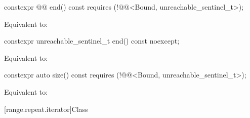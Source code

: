 %
\begin{itemdecl}
constexpr @@ end() const requires (!@@<Bound, unreachable_sentinel_t>);
\end{itemdecl}

\begin{itemdescr}
\pnum
\effects
Equivalent to: 
\end{itemdescr}

%
\begin{itemdecl}
constexpr unreachable_sentinel_t end() const noexcept;
\end{itemdecl}

\begin{itemdescr}
\pnum
\effects
Equivalent to: 
\end{itemdescr}

%
\begin{itemdecl}
constexpr auto size() const requires (!@@<Bound, unreachable_sentinel_t>);
\end{itemdecl}

\begin{itemdescr}
\pnum
\effects
Equivalent to: 
\end{itemdescr}

[range.repeat.iterator]{Class }

